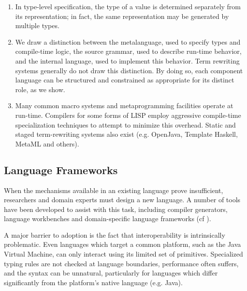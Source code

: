 \documentclass{llncs}
\begin{document}
\begin{enumerate}
\item In type-level specification, the type of a value is determined separately from its representation; in fact, the same representation may be generated by multiple types. 
\item We draw a distinction between the metalanguage, used to specify types and compile-time logic, the source grammar, used to describe run-time behavior, and the internal language, used to implement this behavior. Term rewriting systems generally do not draw this distinction. By doing so, each component language can be structured and constrained as appropriate for its distinct role, as we show.
\item Many common macro systems and metaprogramming facilities operate at run-time. Compilers for some forms of LISP employ aggressive compile-time specialization techniques to attempt to minimize this overhead. Static and staged term-rewriting systems also exist (e.g. OpenJava\cite{TatM:OpenJCBMSJ}, Template Haskell\cite{SheardPeytonJones:Haskell-02}, MetaML \cite{Sheard:1999:UMS} and others). 
\end{enumerate}

\subsection{Language Frameworks}
When the mechanisms available in an existing language prove insufficient, researchers and domain experts must design a new language. A number of tools have been developed to assist with this task, including compiler generators, language workbenches and domain-specific language frameworks (cf \cite{fowler2010domain}).

A major barrier to adoption is the fact that interoperability is intrinsically problematic. Even languages which target a common platform, such as the Java Virtual Machine, can only interact using its limited set of primitives. Specialized typing rules are not checked at language boundaries, performance often suffers, and the syntax can be unnatural, particularly for languages which differ significantly from the platform's native language (e.g. Java).
\end{document}

